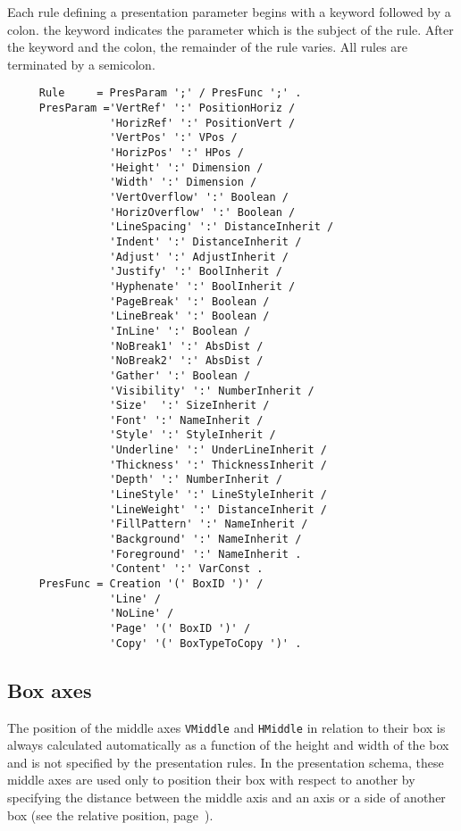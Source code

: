 Each rule defining a presentation parameter begins with a keyword
followed by a colon. the keyword indicates the parameter which is the
subject of the rule.  After the keyword and the colon, the remainder
of the rule varies.  All rules are terminated by a semicolon.

\begin{verbatim}
     Rule     = PresParam ';' / PresFunc ';' .
     PresParam ='VertRef' ':' PositionHoriz /
                'HorizRef' ':' PositionVert /
                'VertPos' ':' VPos /
                'HorizPos' ':' HPos /
                'Height' ':' Dimension /
                'Width' ':' Dimension /
                'VertOverflow' ':' Boolean /
                'HorizOverflow' ':' Boolean /
                'LineSpacing' ':' DistanceInherit /
                'Indent' ':' DistanceInherit /
                'Adjust' ':' AdjustInherit /
                'Justify' ':' BoolInherit /
                'Hyphenate' ':' BoolInherit /
                'PageBreak' ':' Boolean /
                'LineBreak' ':' Boolean /
                'InLine' ':' Boolean /
                'NoBreak1' ':' AbsDist /
                'NoBreak2' ':' AbsDist /
                'Gather' ':' Boolean /
                'Visibility' ':' NumberInherit /
                'Size'  ':' SizeInherit /
                'Font' ':' NameInherit /
                'Style' ':' StyleInherit /
                'Underline' ':' UnderLineInherit /
                'Thickness' ':' ThicknessInherit /
                'Depth' ':' NumberInherit /
                'LineStyle' ':' LineStyleInherit /
                'LineWeight' ':' DistanceInherit /
                'FillPattern' ':' NameInherit /
                'Background' ':' NameInherit /
                'Foreground' ':' NameInherit .
                'Content' ':' VarConst .
     PresFunc = Creation '(' BoxID ')' /
                'Line' /
                'NoLine' /
                'Page' '(' BoxID ')' /
                'Copy' '(' BoxTypeToCopy ')' .
\end{verbatim}

\subsection{Box axes}

The position of the middle axes {\tt VMiddle} and {\tt HMiddle} in
relation to their box is always calculated automatically as a function
of the height and width of the box and is not specified by the
presentation rules.  In the presentation schema, these middle axes are
used only to position their box with respect to another by specifying
the distance between the middle axis and an axis or a side of another
box (see the relative position, page~\pageref{position}).

